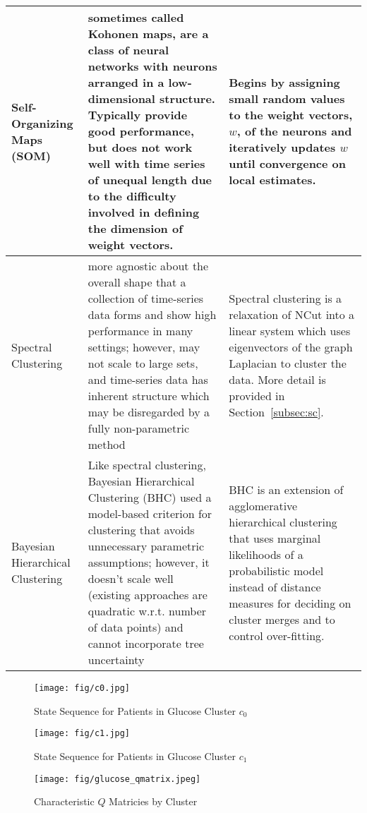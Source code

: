 \begin{landscape}
\begin{table}
\begin{tabular}{| p{2cm} | p{10.5cm} | p{8.5cm}  |}
Self-Organizing Maps (SOM) & sometimes called Kohonen maps, are a class of neural networks with neurons arranged in a low-dimensional structure.  Typically provide good performance, but does not work well with time series of unequal length due to the difficulty involved in defining the dimension of weight vectors. & Begins by assigning small random values to the weight vectors, $w$, of the neurons and iteratively updates $w$ until convergence on local estimates.\\ \hline

   Spectral Clustering & more agnostic about the overall shape that a collection of time-series data forms and show high performance in many settings; however, may not scale to large sets, and time-series data has inherent structure which may be disregarded by a fully non-parametric method & Spectral clustering is a relaxation of NCut into a linear system which uses eigenvectors of the graph Laplacian to cluster the data.  More detail is provided in Section~\ref{subsec:sc}.\\ \hline

       Bayesian Hierarchical Clustering & Like spectral clustering,  Bayesian Hierarchical Clustering (BHC) used a model-based criterion for clustering that avoids unnecessary parametric assumptions; however, it doesn't scale well (existing approaches are quadratic w.r.t. number of data points) and cannot incorporate tree uncertainty & BHC is an extension of agglomerative hierarchical clustering that uses marginal likelihoods of a probabilistic model instead of distance measures for deciding on cluster merges and to control over-fitting.\\ \hline
    \end{tabular}
\end{table}
\end{landscape}

\begin{figure}
\begin{center}
\centerline{\texttt{[image: fig/c0.jpg]}}
\caption{State Sequence for Patients in Glucose Cluster $c_0$}
\label{c0}
\end{center}
\vskip -0.2in
\end{figure}

\begin{figure}
\begin{center}
\centerline{\texttt{[image: fig/c1.jpg]}}
\caption{State Sequence for Patients in Glucose Cluster $c_1$}
\label{c1}
\end{center}
\vskip -0.2in
\end{figure}


 \begin{figure}[ht]
  \centering
  \texttt{[image: fig/glucose\_qmatrix.jpeg]}\\
  \caption{Characteristic $Q$ Matricies by Cluster}\label{glucose_qmatrix}
\end{figure}









